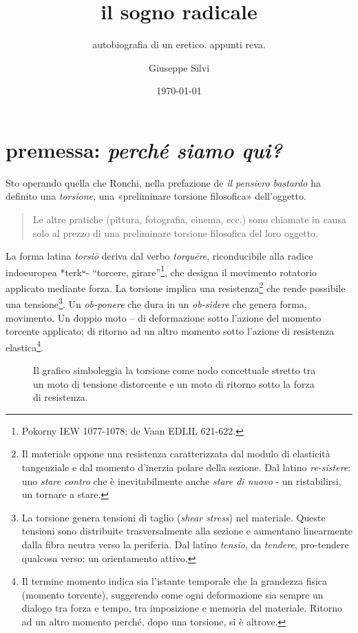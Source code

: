 \documentclass{gs}
\title{il sogno radicale}
\subtitle{autobiografia di un eretico. appunti reva.}
\author{Giuseppe Silvi}
\date{\today}
\begin{document}
\maketitle

\section*{premessa: \emph{perché siamo qui?}}

Sto operando quella che Ronchi, nella prefazione de \emph{il pensiero bastardo} \cite{ronchi2001} ha definito una \emph{torsione}, una «preliminare torsione filosofica» dell'oggetto.

\begin{quote}
\begin{sf}
\small
  Le altre pratiche (pittura, fotografia, cinema, ecc.) sono chiamate in causa solo al prezzo di una preliminare torsione filosofica del loro oggetto. \cite{ronchi2001}
  \end{sf}
\end{quote}

La forma latina \textit{torsiō} deriva dal verbo \textit{torquēre}, riconducibile alla radice indoeuropea *terkʷ- “torcere, girare”\footnote{Pokorny IEW 1077-1078; de Vaan EDLIL 621-622.}, che designa il movimento rotatorio applicato mediante forza. La torsione implica una resistenza\footnote{Il materiale oppone una resistenza caratterizzata dal modulo di elasticità tangenziale e dal momento d'inerzia polare della sezione. Dal latino \emph{re-sistere}: uno \emph{stare contro} che è inevitabilmente anche \emph{stare di nuovo} - un ristabilirsi, un tornare a stare.} che rende possibile una tensione\footnote{La torsione genera tensioni di taglio (\emph{shear stress}) nel materiale. Queste tensioni sono distribuite trasversalmente alla sezione e aumentano linearmente dalla fibra neutra verso la periferia. Dal latino \emph{tensio}, da \emph{tendere}, pro-tendere qualcosa verso; un orientamento attivo.}. Un \emph{ob-ponere} che dura in un \emph{ob-sidere} che genera forma, movimento. Un doppio moto – di deformazione sotto l'azione del momento torcente applicato; di ritorno ad un altro momento sotto l'azione di resistenza elastica\footnote{Il termine momento indica sia l'istante temporale che la grandezza fisica (momento torcente), suggerendo come ogni deformazione sia sempre un dialogo tra forza e tempo, tra imposizione e memoria del materiale. Ritorno ad un altro momento perché, dopo una torsione, si è altrove.}.

\begin{figure}[htbp]
\begin{center}
\caption{Il grafico simboleggia la torsione come nodo concettuale stretto tra un moto di tensione distorcente e un moto di ritorno sotto la forza di resistenza.}
\label{torsione}
\end{center}
\end{figure}
\end{document}
